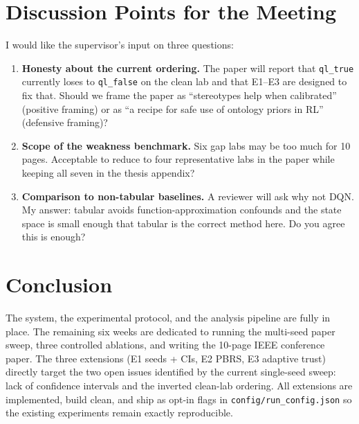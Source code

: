 \documentclass[conference]{IEEEtran}
\begin{document}
\section{Discussion Points for the Meeting}
\label{sec:meeting}

I would like the supervisor's input on three questions:

\begin{enumerate}
  \item \textbf{Honesty about the current ordering.} The paper will
        report that \texttt{ql\_true} currently loses to
        \texttt{ql\_false} on the clean lab and that E1--E3 are
        designed to fix that. Should we frame the paper as
        ``stereotypes help when calibrated'' (positive framing) or
        as ``a recipe for safe use of ontology priors in RL''
        (defensive framing)?
  \item \textbf{Scope of the weakness benchmark.} Six gap labs may be
        too much for 10 pages. Acceptable to reduce to four
        representative labs in the paper while keeping all seven in
        the thesis appendix?
  \item \textbf{Comparison to non-tabular baselines.} A reviewer will
        ask why not DQN. My answer: tabular avoids
        function-approximation confounds and the state space is
        small enough that tabular is the correct method here.
        Do you agree this is enough?
\end{enumerate}

\section{Conclusion}
\label{sec:conclusion}

The system, the experimental protocol, and the analysis pipeline are
fully in place. The remaining six weeks are dedicated to running the
multi-seed paper sweep, three controlled ablations, and writing the
10-page IEEE conference paper. The three extensions (E1 seeds + CIs,
E2 PBRS, E3 adaptive trust) directly target the two open issues
identified by the current single-seed sweep: lack of confidence
intervals and the inverted clean-lab ordering. All extensions are
implemented, build clean, and ship as opt-in flags in
\verb|config/run_config.json| so the existing experiments remain
exactly reproducible.
\end{document}

